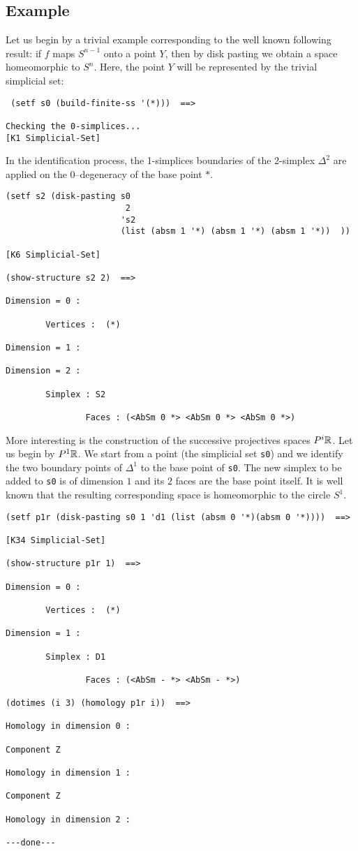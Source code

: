 \newpage

\subsection* {Example}

Let us begin by a trivial example corresponding to the well known following result:
if $f$ maps $S^{n-1}$ onto a point $Y$, then by disk pasting we obtain a space homeomorphic to $S^n$. 
Here, the point $Y$ will be represented by the trivial simplicial set:

{\footnotesize\begin{verbatim}
 (setf s0 (build-finite-ss '(*)))  ==>

Checking the 0-simplices...
[K1 Simplicial-Set]
\end{verbatim}}
In the identification process, the 1-simplices boundaries of the 2-simplex $\Delta^2$
are applied on the 0--degeneracy of the base point $*$.
{\footnotesize\begin{verbatim}
(setf s2 (disk-pasting s0 
                        2 
                       's2 
                       (list (absm 1 '*) (absm 1 '*) (absm 1 '*))  )) 

[K6 Simplicial-Set]

(show-structure s2 2)  ==>

Dimension = 0 :

        Vertices :  (*)

Dimension = 1 :

Dimension = 2 :

        Simplex : S2

                Faces : (<AbSm 0 *> <AbSm 0 *> <AbSm 0 *>)
\end{verbatim}}
More interesting is the construction of the successive projectives spaces
$P^i{{\Bbb R}}$. Let us begin by $P^1{{\Bbb R}}$. We start from a point (the simplicial set {\tt s0}) 
and we identify the two boundary
points of $\Delta^1$ to the base point of {\tt s0}. The new simplex to be added to {\tt s0}
is of dimension $1$ and its $2$ faces  are the base point itself. It is well known that
the resulting corresponding  space is homeomorphic to the circle $S^1$.
{\footnotesize\begin{verbatim}
(setf p1r (disk-pasting s0 1 'd1 (list (absm 0 '*)(absm 0 '*))))  ==>

[K34 Simplicial-Set]

(show-structure p1r 1)  ==>

Dimension = 0 :

        Vertices :  (*)

Dimension = 1 :

        Simplex : D1

                Faces : (<AbSm - *> <AbSm - *>)

(dotimes (i 3) (homology p1r i))  ==>

Homology in dimension 0 :

Component Z

Homology in dimension 1 :

Component Z

Homology in dimension 2 :

---done---
\end{verbatim} }

